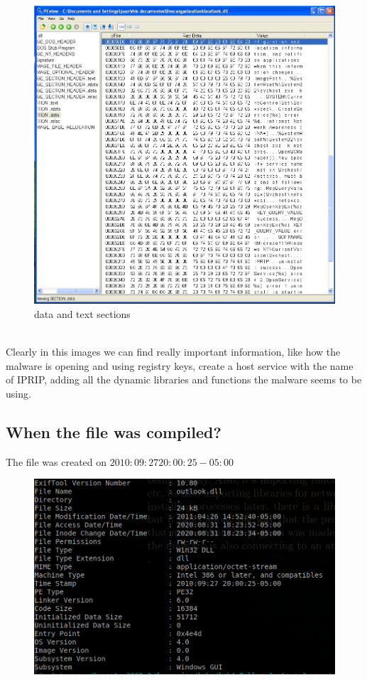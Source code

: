 \documentclass[12pt,letter]{article} %
\begin{document}
		\begin{figure}[h!]
			\centering
			\includegraphics[scale=0.28]{img3.jpeg}
			\caption{data and text sections}
			\label{5}
		\end{figure}$ $
		\pagebreak$ $\\
		Clearly in this images we can find really important information, like how the malware is opening and using registry keys, create a host service with the name of IPRIP, adding all the dynamic libraries and functions the malware seems to be using.
        \subsection{When the file was compiled?}
            The file was created on $ 2010:09:27 20:00:25-05:00  $
            \begin{figure}[h!]
            \includegraphics[width=0.8\linewidth]{exif.png}
            \end{figure}
\end{document}
